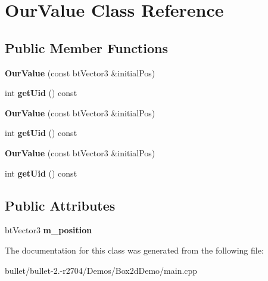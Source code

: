\hypertarget{class_our_value}{\section{Our\+Value Class Reference}
\label{class_our_value}
}
\subsection*{Public Member Functions}
\begin{DoxyCompactItemize}
\item 
\hypertarget{class_our_value_a0ad92284bd21a5ec307fb1d4d0f8940d}{{\bfseries Our\+Value} (const bt\+Vector3 \&initial\+Pos)}\label{class_our_value_a0ad92284bd21a5ec307fb1d4d0f8940d}

\item 
\hypertarget{class_our_value_aba708b25ca6e46bacb2bae34d8cbad5e}{int {\bfseries get\+Uid} () const }\label{class_our_value_aba708b25ca6e46bacb2bae34d8cbad5e}

\item 
\hypertarget{class_our_value_a0ad92284bd21a5ec307fb1d4d0f8940d}{{\bfseries Our\+Value} (const bt\+Vector3 \&initial\+Pos)}\label{class_our_value_a0ad92284bd21a5ec307fb1d4d0f8940d}

\item 
\hypertarget{class_our_value_aba708b25ca6e46bacb2bae34d8cbad5e}{int {\bfseries get\+Uid} () const }\label{class_our_value_aba708b25ca6e46bacb2bae34d8cbad5e}

\item 
\hypertarget{class_our_value_a0ad92284bd21a5ec307fb1d4d0f8940d}{{\bfseries Our\+Value} (const bt\+Vector3 \&initial\+Pos)}\label{class_our_value_a0ad92284bd21a5ec307fb1d4d0f8940d}

\item 
\hypertarget{class_our_value_aba708b25ca6e46bacb2bae34d8cbad5e}{int {\bfseries get\+Uid} () const }\label{class_our_value_aba708b25ca6e46bacb2bae34d8cbad5e}

\end{DoxyCompactItemize}
\subsection*{Public Attributes}
\begin{DoxyCompactItemize}
\item 
\hypertarget{class_our_value_a26b1d096969c967732399bcd619abb07}{bt\+Vector3 {\bfseries m\+\_\+position}}\label{class_our_value_a26b1d096969c967732399bcd619abb07}

\end{DoxyCompactItemize}


The documentation for this class was generated from the following file\+:\begin{DoxyCompactItemize}
\item 
bullet/bullet-\/2.-\/r2704/\+Demos/\+Box2d\+Demo/main.\+cpp\end{DoxyCompactItemize}
